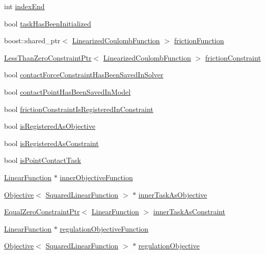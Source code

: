 \begin{DoxyCompactItemize}
\item 
int \hyperlink{structgocra_1_1GHCJTTask_1_1Pimpl_ada601a59aeedcd018df465a5e2e79e03}{index\+End}
\item 
bool \hyperlink{structgocra_1_1GHCJTTask_1_1Pimpl_ad07475df136dd26fc89634fa6dd9a9b7}{task\+Has\+Been\+Initialized}
\item 
boost\+::shared\+\_\+ptr$<$ \hyperlink{classocra_1_1LinearizedCoulombFunction}{Linearized\+Coulomb\+Function} $>$ \hyperlink{structgocra_1_1GHCJTTask_1_1Pimpl_a777d7f0a74a42508154b153dbc0a3b44}{friction\+Function}
\item 
\hyperlink{classocra_1_1LessThanZeroConstraintPtr}{Less\+Than\+Zero\+Constraint\+Ptr}$<$ \hyperlink{classocra_1_1LinearizedCoulombFunction}{Linearized\+Coulomb\+Function} $>$ \hyperlink{structgocra_1_1GHCJTTask_1_1Pimpl_a51c9a1862cf46b8ac75a525924d990bb}{friction\+Constraint}
\item 
bool \hyperlink{structgocra_1_1GHCJTTask_1_1Pimpl_a2cb3237a503679f5dcc201c05b00f248}{contact\+Force\+Constraint\+Has\+Been\+Saved\+In\+Solver}
\item 
bool \hyperlink{structgocra_1_1GHCJTTask_1_1Pimpl_acd52e769176ed61ce95a322b1adc8c10}{contact\+Point\+Has\+Been\+Saved\+In\+Model}
\item 
bool \hyperlink{structgocra_1_1GHCJTTask_1_1Pimpl_ad92c2fff381cdb00f6afb41671e923c5}{friction\+Constraint\+Is\+Registered\+In\+Constraint}
\item 
bool \hyperlink{structgocra_1_1GHCJTTask_1_1Pimpl_ac3772fc7a816ef1ba5ac40b79908d225}{is\+Registered\+As\+Objective}
\item 
bool \hyperlink{structgocra_1_1GHCJTTask_1_1Pimpl_aace8728a2e9a0271ea89aea0355c036b}{is\+Registered\+As\+Constraint}
\item 
bool \hyperlink{structgocra_1_1GHCJTTask_1_1Pimpl_a900c0b0bf150ba085a300ff543054a36}{is\+Point\+Contact\+Task}
\item 
\hyperlink{classocra_1_1LinearFunction}{Linear\+Function} $\ast$ \hyperlink{structgocra_1_1GHCJTTask_1_1Pimpl_a1faaaea4991fa4a0bec914732c189fd3}{inner\+Objective\+Function}
\item 
\hyperlink{classocra_1_1Objective}{Objective}$<$ \hyperlink{classocra_1_1SquaredLinearFunction}{Squared\+Linear\+Function} $>$ $\ast$ \hyperlink{structgocra_1_1GHCJTTask_1_1Pimpl_a43d0c542d4107893610d8d07cce2fdd0}{inner\+Task\+As\+Objective}
\item 
\hyperlink{classocra_1_1EqualZeroConstraintPtr}{Equal\+Zero\+Constraint\+Ptr}$<$ \hyperlink{classocra_1_1LinearFunction}{Linear\+Function} $>$ \hyperlink{structgocra_1_1GHCJTTask_1_1Pimpl_aca6261d2f483c550e6e71c4d31b7c0c1}{inner\+Task\+As\+Constraint}
\item 
\hyperlink{classocra_1_1LinearFunction}{Linear\+Function} $\ast$ \hyperlink{structgocra_1_1GHCJTTask_1_1Pimpl_a74195cf444c7ab8673985cf9cd7de28d}{regulation\+Objective\+Function}
\item 
\hyperlink{classocra_1_1Objective}{Objective}$<$ \hyperlink{classocra_1_1SquaredLinearFunction}{Squared\+Linear\+Function} $>$ $\ast$ \hyperlink{structgocra_1_1GHCJTTask_1_1Pimpl_a59fe897e1cfa0a5b28a52f0d1be7d13d}{regulation\+Objective}
\end{DoxyCompactItemize}


